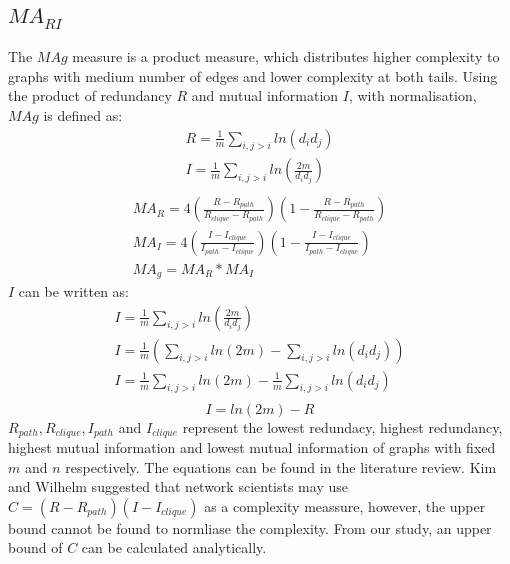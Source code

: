 \documentclass[12pt]{article}
\begin{document}
\subsection{$MA_{RI}$}
The $MAg$ measure is a product measure, which distributes higher complexity to graphs with medium number of edges and lower complexity at both tails. Using the product of redundancy $R$ and mutual information $I$, with normalisation, $MAg$ is defined as\cite{KIM20082637}:
\begin{equation}
    \label{eq:RandI}
    \begin{gathered}
        R = \frac{1}{m}\sum_{i,j>i}ln(d_id_j)\\
        I = \frac{1}{m}\sum_{i,j>i}ln(\frac{2m}{d_id_j})\\
    \end{gathered}
\end{equation}
\begin{equation}
    \label{eq:mag}
    \begin{gathered}
        MA_R = 4(\frac{R-R_{path}}{R_{clique}-R_{path}})(1-\frac{R-R_{path}}{R_{clique}-R_{path}})\\
        MA_I = 4(\frac{I-I_{clique}}{I_{path}-I_{clique}})(1-\frac{I-I_{clique}}{I_{path}-I_{clique}})\\
        MA_g = MA_R * MA_I
    \end{gathered}
\end{equation}
$I$ can be written as:
\begin{equation}
    \begin{gathered}
        \label{eq:rewriteI}
        I = \frac{1}{m}\sum_{i,j>i}ln(\frac{2m}{d_id_j})\\
        I = \frac{1}{m}(\sum_{i,j>i}ln(2m)-\sum_{i,j>i}ln(d_id_j))\\
        I = \frac{1}{m}\sum_{i,j>i}ln(2m)-\frac{1}{m}\sum_{i,j>i}ln(d_id_j)\\
    \end{gathered}
\end{equation}
\begin{equation}
    \label{eq:mutual_info}
    I = ln(2m)-R
\end{equation}
\noindent
$R_{path},R_{clique},I_{path}$ and $I_{clique}$ represent the lowest redundacy, highest redundancy, highest mutual information and lowest mutual information of graphs with fixed $m$ and $n$ respectively. The equations can be found in the literature review. Kim and Wilhelm suggested that network scientists may use $C=(R-R_{path})(I-I_{clique})$ as a complexity meassure, however, the upper bound cannot be found to normliase the complexity. From our study, an upper bound of $C$ can be calculated analytically.\\
\end{document}
